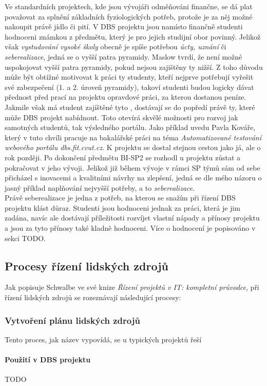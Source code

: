 Ve standardních projektech, kde jsou vývojáři odměňováni finančne, se dá plat považovat za splnění základních fyziologických potřeb, protože je za něj možné nakoupit právě jídlo či pití. V DBS projektu jsou namísto finančně studenti hodnoceni známkou z předmětu, který je pro jejich studijní obor povinný. Jelikož však \emph{vystudování vysoké školy} obecně je spíše potřebou \emph{úcty, uznání} či \emph{seberealizace}, jedná se o vyšší patra pyramidy. Maslow tvrdí, že není možné uspokojovat vyšší patra pyramidy, pokud nejsou zajištěny ty nižší. Z toho důvodu může být obtížné motivovat k práci ty studenty, kteří nejprve potřebují vyřešit své zabezpečení (1. a 2. úroveň pyramidy), takoví studenti budou logicky dávat přednost před prací na projektu opravdové práci, za kterou dostanou peníze. Jakmile však má student zajíštěné tyto , dostávají se do popředí právě ty, které může DBS projekt nabídnout. Toto otevírá skvělé možnosti pro rozvoj jak samotných studentů, tak výsledného portálu. Jako příklad uvedu Pavla Kováře, který v tuto chvíli pracuje na bakalářské práci na téma \emph{Automatizované testování webového portálu dbs.fit.cvut.cz}. K projektu se dostal stejnou cestou jako já, ale o rok později. Po dokončení předmětu BI-SP2 se rozhodl u projektu zůstat a pokračovat v jeho vývoji. Jelikož již během vývoje v rámci SP týmů sám od sebe přicházel s inovacemi a kvalitními návrhy na zlepšení, jedná se dle mého názoru o jasný příklad naplňování nejvyšší potřeby, a to \emph{seberealizace}.\\
Právě seberealizace je jedna z potřeb, na kterou se snažím při řízení DBS projektu klást důraz. Studenti jsou hodnoceni jednak za práci, která je jim zadána, navíc ale dostávají příležitosti rozvíjet vlastní nápady a přínosy projektu a jsou za tyto přínosy také kladně hodnoceni. Více o hodnocení je popisováno v sekci TODO.

\subsection{Procesy řízení lidských zdrojů}

Jak popisuje Schwalbe \cite{schwalbe} ve své knize \emph{Řízení projektů v IT: kompletní průvodce}, při řízení lidských zdrojů se rozeznávají následující procesy:

\subsubsection{Vytvoření plánu lidských zdrojů}

Tento proces, jak název vypovídá, se u typických projektů řeší 


\paragraph{Použití v DBS projektu}
TODO
